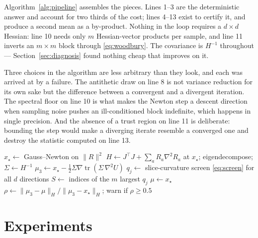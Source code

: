 \documentclass[11pt]{article}
\newcommand{\tr}{\operatorname{tr}}
\newcommand{\xmap}{x_{\star}}
\theoremstyle{plain}
\theoremstyle{definition}
\theoremstyle{remark}
\begin{document}
Algorithm~\ref{alg:pipeline} assembles the pieces. Lines 1--3 are the deterministic answer and
account for two thirds of the cost; lines 4--13 exist to certify it, and produce a second mean as a
by-product. Nothing in the loop requires a $d\times d$ Hessian: line 10 needs only $m$
Hessian-vector products per sample, and line 11 inverts an $m\times m$ block through
\eqref{eq:woodbury}. The covariance is $H^{-1}$ throughout --- Section~\ref{sec:diagnosis} found
nothing cheap that improves on it.

Three choices in the algorithm are less arbitrary than they look, and each was arrived at by a
failure. The antithetic draw on line 8 is not variance reduction for its own sake but the
difference between a convergent and a divergent iteration. The spectral floor on line 10 is what
makes the Newton step a descent direction when sampling noise pushes an ill-conditioned block
indefinite, which happens in single precision. And the absence of a trust region on line 11 is
deliberate: bounding the step would make a diverging iterate resemble a converged one and destroy
the statistic computed on line 13.

\begin{algorithm}[t]
\DontPrintSemicolon
\SetAlgoLined
{}
$\xmap \leftarrow$ Gauss--Newton on $\|R\|^2$ 
$H \leftarrow J^\top J + \sum_a R_a\nabla^2R_a$ at $\xmap$; eigendecompose; $\Sigma \leftarrow H^{-1}$ 
$\mu_3 \leftarrow \xmap - \tfrac12\Sigma\nabla\tr(\Sigma\,\nabla^2 U)$ 
$q_j \leftarrow$ slice-curvature screen \eqref{eq:screen} for all $d$ directions 
$S \leftarrow$ indices of the $m$ largest $q_j$\;
$\mu \leftarrow \xmap$\;
$\rho \leftarrow \|\mu_3-\mu\|_H/\|\mu_3-\xmap\|_H$; warn if $\rho \ge 0.5$\;
\caption{Deterministic MAGI posterior, $\approx 1.1$\,s at $d=325$}
\label{alg:pipeline}
\end{algorithm}

\section{Experiments}
\label{sec:experiments}
\end{document}
